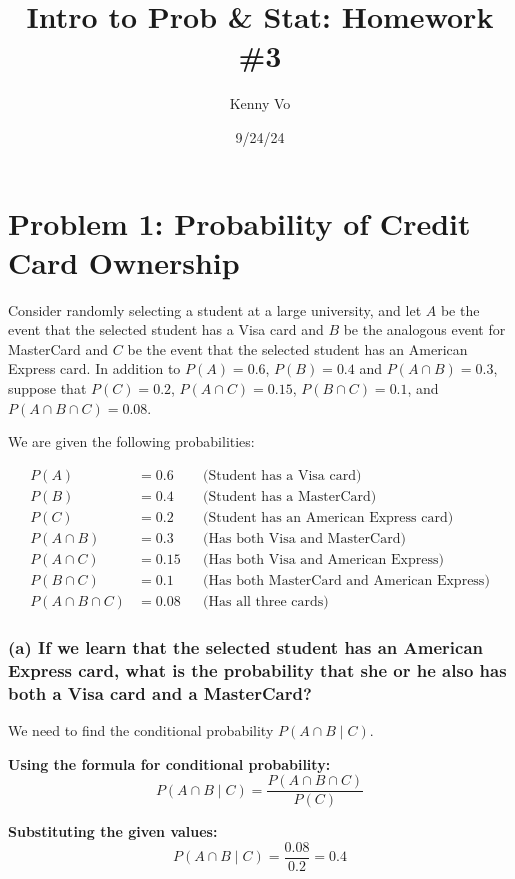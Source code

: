 \documentclass{article}
\title{Intro to Prob \& Stat: Homework \#3}
\author{Kenny Vo}
\date{9/24/24}
\begin{document}
\maketitle

\section*{Problem 1: Probability of Credit Card Ownership}

Consider randomly selecting a student at a large university, and let $A$ be the event that the selected student has a Visa card and $B$ be the analogous event for MasterCard and $C$ be the event that the selected student has an American Express card. In addition to $P(A) = 0.6$, $P(B) = 0.4$ and $P(A \cap B) = 0.3$, suppose that $P(C) = 0.2$, $P(A \cap C) = 0.15$, $P(B \cap C) = 0.1$, and $P(A \cap B \cap C) = 0.08$.


We are given the following probabilities:

\[
\begin{aligned}
P(A) &= 0.6 & &\text{(Student has a Visa card)} \\
P(B) &= 0.4 & &\text{(Student has a MasterCard)} \\
P(C) &= 0.2 & &\text{(Student has an American Express card)} \\
P(A \cap B) &= 0.3 & &\text{(Has both Visa and MasterCard)} \\
P(A \cap C) &= 0.15 & &\text{(Has both Visa and American Express)} \\
P(B \cap C) &= 0.1 & &\text{(Has both MasterCard and American Express)} \\
P(A \cap B \cap C) &= 0.08 & &\text{(Has all three cards)}
\end{aligned}
\]

\subsubsection*{(a) If we learn that the selected student has an American Express card, what is the probability that she or he also has both a Visa card and a MasterCard?}

We need to find the conditional probability \( P(A \cap B \mid C) \).

\textbf{Using the formula for conditional probability:}
\[
P(A \cap B \mid C) = \frac{P(A \cap B \cap C)}{P(C)}
\]

\textbf{Substituting the given values:}
\[
P(A \cap B \mid C) = \frac{0.08}{0.2} = 0.4
\]
\end{document}
